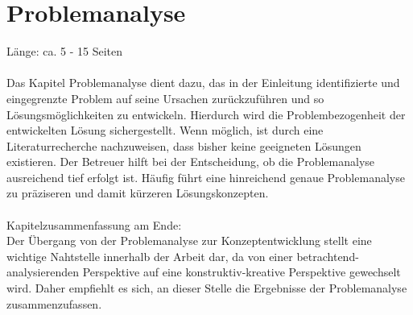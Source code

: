 \chapter{Problemanalyse}
Länge: ca. 5 - 15 Seiten\\\\
Das Kapitel Problemanalyse dient dazu, das in der Einleitung identifizierte und eingegrenzte Problem auf seine Ursachen zurückzuführen und so Lösungsmöglichkeiten zu entwickeln. Hierdurch wird die Problembezogenheit der entwickelten Lösung sichergestellt. Wenn möglich, ist durch eine Literaturrecherche nachzuweisen, dass bisher keine geeigneten Lösungen existieren. Der Betreuer hilft bei der Entscheidung, ob die Problemanalyse ausreichend tief erfolgt ist. Häufig führt eine hinreichend genaue Problemanalyse zu präziseren und damit kürzeren Lösungskonzepten.\\\\

\noindent Kapitelzusammenfassung am Ende:\\
Der Übergang von der Problemanalyse zur Konzeptentwicklung stellt eine wichtige Nahtstelle innerhalb der Arbeit dar, da von einer betrachtend-analysierenden Perspektive auf eine konstruktiv-kreative Perspektive gewechselt wird. Daher empfiehlt es sich, an dieser Stelle die Ergebnisse der Problemanalyse zusammenzufassen.

